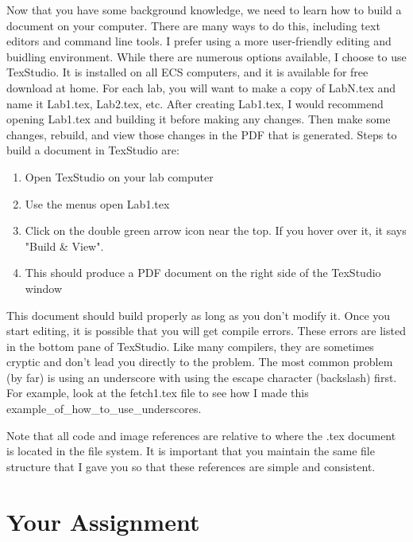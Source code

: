 Now that you have some background knowledge, we need to learn how to build a document on your computer.  There are many ways to do this, including text editors and command line tools.  I prefer using a more user-friendly editing and buidling environment.  While there are numerous options available, I choose to use TexStudio.  It is installed on all ECS computers, and it is available for free download at home.  For each lab, you will want to make a copy of LabN.tex and name it Lab1.tex, Lab2.tex, etc.  After creating Lab1.tex, I would recommend opening Lab1.tex and building it before making any changes.  Then make some changes, rebuild, and view those changes in the PDF that is generated.  Steps to build a document in TexStudio are:
\begin{enumerate}
	\item Open TexStudio on your lab computer
	\item Use the menus open Lab1.tex
	\item Click on the double green arrow icon near the top.  If you hover over it, it says "Build \& View".
	\item This should produce a PDF document on the right side of the TexStudio window
\end{enumerate}

This document should build properly as long as you don't modify it.  Once you start editing, it is possible that you will get compile errors.  These errors are listed in the bottom pane of TexStudio.  Like many compilers, they are sometimes cryptic and don't lead you directly to the problem.  The most common problem (by far) is using an underscore with using the escape character (backslash) first.  For example, look at the fetch1.tex file to see how I made this  example\_of\_how\_to\_use\_underscores.

Note that all code and image references are relative to where the .tex document is located in the file system.  It is important that you maintain the same file structure that I gave you so that these references are simple and consistent.

\section{Your Assignment}

